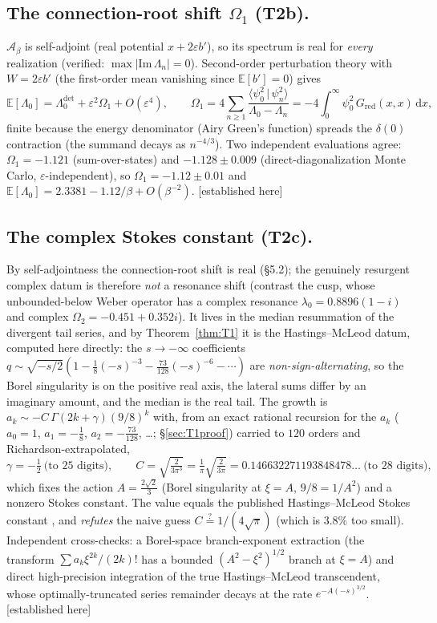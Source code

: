 \documentclass[11pt,reqno]{amsart}
\theoremstyle{plain}
\theoremstyle{definition}
\theoremstyle{remark}
\newcommand{\dd}{\,\mathrm{d}}
\newcommand{\E}{\mathbb{E}}
\newcommand{\SAO}{\mathcal{A}_\beta}
\newcommand{\eps}{\varepsilon}
\newcommand{\tagPr}{{\footnotesize\textsf{[established here]}}}
\begin{document}
\subsection{The connection-root shift $\Omega_1$ (T2b).}
$\SAO$ is self-adjoint (real potential $x+2\eps b'$), so its spectrum is real for \emph{every}
realization (verified: $\max|\mathrm{Im}\,\Lambda_n|=0$). Second-order perturbation theory with
$W=2\eps b'$ (the first-order mean vanishing since $\E[b']=0$) gives
\begin{equation}\label{eq:om1}
\E[\Lambda_0]=\Lambda_0^{\det}+\eps^2\Omega_1+O(\eps^4),\qquad
\Omega_1=4\!\sum_{n\ge1}\frac{\langle\psi_0^2\,|\,\psi_n^2\rangle}{\Lambda_0-\Lambda_n}
=-4\!\int_0^\infty\!\psi_0^2\,G_{\mathrm{red}}(x,x)\dd x,
\end{equation}
finite because the energy denominator (Airy Green's function) spreads the $\delta(0)$ contraction
(the summand decays as $n^{-4/3}$). Two independent evaluations agree:
$\Omega_1=-1.121$ (sum-over-states) and $-1.128\pm0.009$ (direct-diagonalization Monte Carlo,
$\eps$-independent), so $\Omega_1=-1.12\pm0.01$ and $\E[\Lambda_0]=2.3381-1.12/\beta+O(\beta^{-2})$.
\tagPr

\subsection{The complex Stokes constant (T2c).}
By self-adjointness the connection-root shift is real (\S5.2); the genuinely resurgent complex
datum is therefore \emph{not} a resonance shift (contrast the cusp, whose unbounded-below Weber
operator has a complex resonance $\lambda_0=0.8896(1-i)$ and complex $\Omega_2=-0.451+0.352i$). It
lives in the median resummation of the divergent tail series, and by Theorem~\ref{thm:T1} it is the
Hastings--McLeod datum, computed here directly: the $s\to-\infty$ coefficients
$q\sim\sqrt{-s/2}(1-\tfrac18(-s)^{-3}-\tfrac{73}{128}(-s)^{-6}-\cdots)$ are
\emph{non-sign-alternating}, so the Borel singularity is on the positive real axis, the lateral
sums differ by an imaginary amount, and the median is the real tail. The growth is
$a_k\sim -C\,\Gamma(2k+\gamma)(9/8)^k$ with, from an exact rational recursion for the $a_k$
($a_0{=}1$, $a_1{=}-\tfrac18$, $a_2{=}-\tfrac{73}{128}$, \dots; \S\ref{sec:T1proof}) carried to $120$
orders and Richardson-extrapolated,
\[
  \gamma=-\tfrac12\ \text{(to $25$ digits)},\qquad
  C=\sqrt{\tfrac{2}{3\pi^3}}=\tfrac1\pi\sqrt{\tfrac{2}{3\pi}}=0.146632271193848478\ldots\ \text{(to $28$ digits)},
\]
which fixes the action $A=\tfrac{2\sqrt2}{3}$ (Borel singularity at $\xi=A$, $9/8=1/A^2$) and a nonzero
Stokes constant. The value equals the published Hastings--McLeod Stokes constant
\cite{Dunne2025,KapaevHM,BothnerRHP}, and \emph{refutes} the naive guess $C\stackrel?=1/(4\sqrt\pi)$
(which is $3.8\%$ too small). Independent cross-checks: a Borel-space branch-exponent extraction
(the transform $\sum a_k\xi^{2k}/(2k)!$ has a bounded $(A^2-\xi^2)^{1/2}$ branch at $\xi=A$) and direct
high-precision integration of the true Hastings--McLeod transcendent, whose optimally-truncated series
remainder decays at the rate $e^{-A(-s)^{3/2}}$. \tagPr
\end{document}
